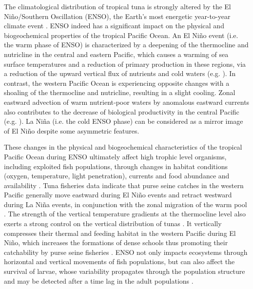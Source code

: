 The climatological distribution of tropical tuna is strongly altered by the El Niño/Southern Oscillation (ENSO), the Earth’s most energetic year-to-year climate event \citep{williamsOverviewTunaFisheries2014, caiChangingNinoSouthern2021}. ENSO indeed has a significant impact on the physical and biogeochemical properties of the tropical Pacific Ocean. 
An El Niño event (i.e. the warm phase of ENSO) is characterized by a  deepening of the thermocline and nutricline in the central and eastern Pacific, which causes a warming of sea surface temperatures and a reduction of primary production in these regions, via a reduction of the upward vertical flux of nutrients and cold waters (e.g. \citealp{chavezBiologicalChemicalResponse1999, murtuguddeOceanColorVariability1999}). In contrast, the western Pacific Ocean is experiencing opposite changes with a shoaling of the thermocline and nutricline, resulting in a slight cooling. Zonal eastward advection of warm nutrient‐poor waters by anomalous eastward currents also contributes to the decrease of biological productivity in the central Pacific (e.g. \citealp{chavezBiologicalChemicalResponse1999, picautOceanicZoneConvergence2001}). La Niña (i.e. the cold ENSO phase) can be considered as a mirror image of El Niño despite some asymmetric features.  

These changes in the physical and biogeochemical characteristics of the tropical Pacific Ocean during ENSO ultimately affect high trophic level organisms, including exploited fish populations, through changes in habitat conditions (oxygen, temperature, light penetration), currents and food abundance and availability \citep{bertrandNinoSouthernOscillation2020}.  Tuna fisheries data indicate that purse seine catches in the western Pacific generally move eastward during El Niño events and retract  westward during La Niña events, in conjunction with the zonal migration of the warm pool \citep{lehodeyNinoSouthernOscillation1997}. The strength of the vertical temperature gradients at the thermocline level also exerts a strong control on the vertical distribution of tunas \citep[e.g.][]{schaeferMovementsBehaviorHabitat2002}. It vertically compresses their thermal and feeding habitat in the western Pacific during El Niño, which increases the formations of dense schools \citep{mauryCanSchoolingRegulate2017} thus promoting their catchability by purse seine fisheries \citep{bertrandHydrologicalTrophicCharacteristics2002}. ENSO not only impacts ecosystems through horizontal and vertical movements of fish populations, but can also affect the survival of larvae, whose variability propagates through the population structure and may be detected after a time lag in the adult populations \citep{yenSpatialTemporalVariations2016, kimEffectsClimateinducedVariation2015}. 


